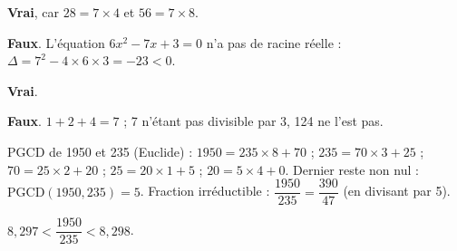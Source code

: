 \documentclass[11pt]{article}
\begin{document}

\begin{questions}
  \item \begin{sousq}
    \item \textbf{Vrai}, car $28 = 7\times 4$ et $56 = 7\times 8$.
    \item \textbf{Faux}. L'équation $6x^2 - 7x + 3 = 0$ n'a pas de racine réelle : $\Delta = 7^2 - 4\times 6\times 3 = -23 < 0$.
    \item \textbf{Vrai}.
    \item \textbf{Faux}. $1 + 2 + 4 = 7$ ; 7 n'étant pas divisible par 3, 124 ne l'est pas.
  \end{sousq}
  \item \begin{sousq}
    \item PGCD de 1950 et 235 (Euclide) : $1950 = 235\times 8 + 70$ ; $235 = 70\times 3 + 25$ ; $70 = 25\times 2 + 20$ ; $25 = 20\times 1 + 5$ ; $20 = 5\times 4 + 0$. Dernier reste non nul : $\mathrm{PGCD}(1950,235) = 5$. Fraction irréductible : $\dfrac{1950}{235} = \dfrac{390}{47}$ (en divisant par 5).
    \item $8{,}297 < \dfrac{1950}{235} < 8{,}298$.
  \end{sousq}
\end{questions}
\end{document}
